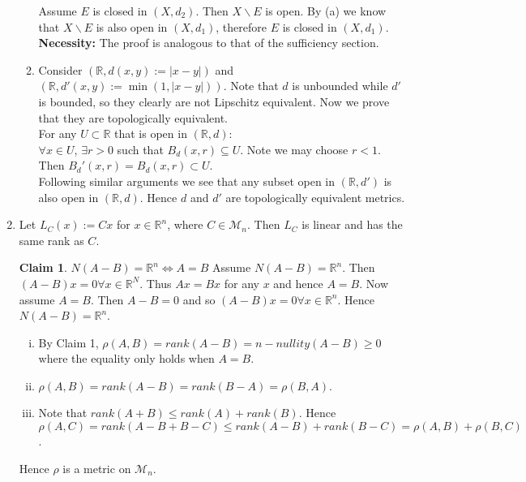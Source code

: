 \documentclass[A4paper,12pt]{article}
\theoremstyle{definition}
\newtheorem{claim}{Claim}
\numberwithin{equation}{section}
\begin{document}
\begin{enumerate}[(1)]
\begin{enumerate}
                Assume $E$ is closed in $(X, d_2)$. Then $X\backslash E$ is open. 
                By (a) we know that $X\backslash E$ is also open in $(X,d_1)$, 
                therefore $E$ is closed in $(X, d_1)$.
                \\
                \textbf{Necessity:}
                The proof is analogous to that of the sufficiency section.
            \item
                Consider $(\mathbb{R}, d(x,y):= |x-y|)$ and $(\mathbb{R}, d'(x, y) := \min(1, |x-y|))$.
                Note that $d$ is unbounded while $d'$ is bounded, so they clearly are not Lipschitz equivalent.
                Now we prove that they are topologically equivalent.
                \\For any $U \subset \mathbb{R}$ that is open in $(\mathbb{R}, d)$:\\
                $\forall x \in U$, $\exists r>0$ such that $B_d(x, r) \subseteq U$. Note we may choose $r<1$. Then $B_d'(x, r)=B_d(x, r) \subset U$.
                \\Following similar arguments we see that any subset open in $(\mathbb{R}, d')$ is also open in $(\mathbb{R}, d)$. Hence $d$ and $d'$ are topologically equivalent metrics.
        \end{enumerate}

    \item 
        Let $L_C(x):= Cx$ for $x \in \mathbb{R}^n$, where $C \in \mathcal{M}_n$. 
        Then $L_C$ is linear and has the same rank as $C$.
        \begin{claim}
            $N(A-B) = \mathbb{R}^n \iff A = B$
            \proof
            Assume $N(A-B) = \mathbb{R}^n$. Then $(A-B)x = 0 \forall x \in \mathbb{R}^N$. Thus $Ax = Bx$ for any $x$ and hence $A = B$.
            Now assume $A = B$. Then $A-B = 0$ and so $(A-B)x = 0 \forall x \in \mathbb{R}^n$. Hence $N(A-B) = \mathbb{R}^n$.
        \end{claim}
        \begin{enumerate}[(i)]
            \item
                By Claim 1, $\rho(A,B) = rank(A-B) = n-nullity(A-B) \ge 0$ where the equality only holds when $A = B$.
            \item
                $\rho(A,B) = rank(A-B) = rank(B-A) = \rho(B,A)$.
            \item
                Note that $rank(A+B) \le rank(A) + rank(B)$. Hence $\rho(A,C) = rank(A-B+B-C) \le rank(A-B) + rank(B-C) = \rho(A,B) + \rho(B,C)$.
        \end{enumerate}
        Hence $\rho$ is a metric on $\mathcal{M}_n$.


\end{enumerate}
\end{document}
